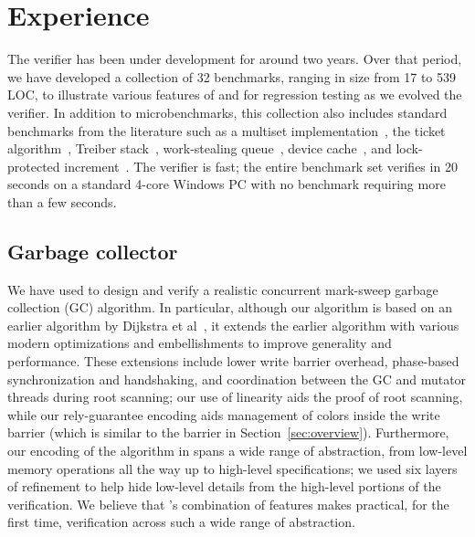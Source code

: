 \section{Experience}
\label{sec:experience}

The \civl verifier has been under development for around two years.  
Over that period, we have developed a collection of 32 benchmarks, 
ranging in size from 17 to 539 LOC, to illustrate various features of
\civl and for regression testing as we evolved the verifier.
In addition to microbenchmarks, this collection also includes
standard benchmarks from the literature such as a multiset implementation~\cite{ElmasTQ05}, 
the ticket algorithm~\cite{FarzanKP14}, 
Treiber stack~\cite{Herlihy2008}, work-stealing queue~\cite{Blumofe1999},
device cache~\cite{ElmasQT09}, and lock-protected increment~\cite{FlanaganQ03}. 
The \civl verifier is fast; the entire benchmark set verifies in 20 seconds on a standard 4-core Windows PC 
with no benchmark requiring more than a few seconds.

\subsection{Garbage collector}
We have used \civl to design and verify a realistic concurrent mark-sweep garbage collection (GC) algorithm.  
In particular, although our algorithm is based on an earlier algorithm by Dijkstra et al~\cite{dijk78}, 
it extends the earlier algorithm with various modern optimizations and embellishments to improve generality and performance.  
These extensions include lower write barrier overhead, phase-based synchronization and handshaking, 
and coordination between the GC and mutator threads during root scanning; our use of linearity aids the proof of root scanning, 
while our rely-guarantee encoding aids management of colors inside the write barrier
(which is similar to the barrier in Section~\ref{sec:overview}).
Furthermore, our encoding of the algorithm in \civl spans a wide range of abstraction, 
from low-level memory operations all the way up to high-level specifications; 
we used six layers of refinement to help hide low-level details from the high-level portions of the verification.
We believe that \civl's combination of features makes practical, for the first time, verification across such a wide range of abstraction.

